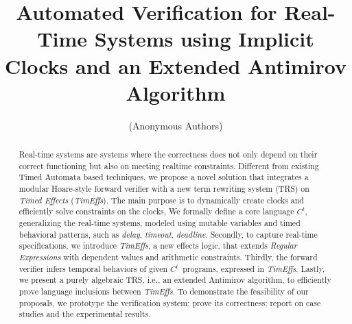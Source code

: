\documentclass[acmsmall,10pt,review]{acmart}
\newcommand{\timedEffects}{\emph{TimEffs}}
\newcommand{\code}[1]{{\tt{\ensuremath{\m{#1}}}}}
\newcommand{\m}{\mathit}
\newcommand{\timedL}{\code{C^{t}}}
\begin{document}
\title{Automated Verification for Real-Time Systems 
using Implicit Clocks and an Extended Antimirov Algorithm}




\author{(Anonymous Authors)}






\begin{abstract} 
Real-time systems are systems where the correctness does not 
only depend on their correct functioning but also on meeting 
realtime constraints.
Different from existing Timed Automata based techniques, 
we propose a novel solution that integrates a 
modular Hoare-style forward verifier with a new term rewriting 
system (TRS) on \emph{Timed Effects} (\timedEffects).
The main purpose is to dynamically create clocks  
and efficiently solve constraints on the clocks, 
We formally define 
a core language \timedL, generalizing the real-time systems, modeled 
using mutable variables and timed behavioral patterns, 
such as \emph{delay}, \emph{timeout}, \emph{deadline}. 
Secondly, to capture real-time specifications, 
we introduce \timedEffects, a new effects logic, 
that extends 
\emph{Regular Expressions} with dependent
values and arithmetic constraints.
Thirdly,  the forward verifier infers temporal behaviors of given 
\timedL\ programs, expressed in \timedEffects. 
Lastly, we present a purely algebraic TRS, i.e., an extended Antimirov algorithm, to 
efficiently prove language inclusions between 
 \timedEffects. 
To demonstrate the feasibility of our proposals, 
we prototype the verification system; prove its 
correctness; report on case studies and the experimental results. 

 



\end{abstract}
\end{document}
